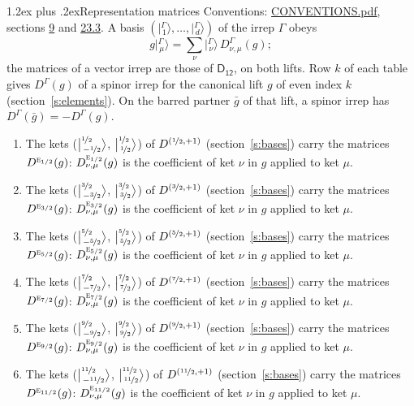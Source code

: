 \documentclass[10pt,a4paper]{article}
\makeatletter
\renewcommand\section{\@startsection{section}{1}{\z@}{-3ex plus -1ex minus -.2ex}%
  {1.2ex plus .2ex}{\normalfont\large\sffamily\bfseries\color{parttitle}}}
\numberwithin{equation}{section}
\newcommand{\grp}[1]{\mathsf{#1}}
\newcommand{\irr}[1]{\text{\normalfont\scshape #1}}
\newcommand{\irrJp}[2]{D^{(#1,#2)}}
\newcommand{\repD}[1]{D^{#1}}
\newcommand{\intx}{\mu}
\newcommand{\jm}[2]{\bigl\lvert{}^{#1}_{\,#2}\bigr\rangle}
\newcommand{\irket}[2]{\bigl\lvert{}^{#1}_{\,#2}\bigr\rangle}
\newcommand{\barred}[1]{\bar{#1}}
\newenvironment{romanlist}{\begin{enumerate}%
\renewcommand{\labelenumi}{(\roman{enumi})}}%
  {\end{enumerate}}
\makeatother
\begin{document}
\section{Representation matrices}\label{s:irrep_matrices}
Conventions: \href{../../CONVENTIONS.pdf}{CONVENTIONS.pdf}, sections \href{../../../rotation/CONVENTIONS.pdf\#conv.9}{9} and \href{../../CONVENTIONS.pdf\#conv.23.3}{23.3}.
\leavevmode\label{n:vector.ket.partner}\label{n:index.partner}\label{n:matrix.irrep}\label{n:index.partner.summed}A basis $(\irket{\Gamma}{1}, \dots, \irket{\Gamma}{d})$ of the irrep $\Gamma$ obeys
\begin{equation}\label{e:partner}g\irket{\Gamma}{\intx} = \sum_\nu \irket{\Gamma}{\nu}\, \repD{\Gamma}_{\nu,\intx}(g);\end{equation}
the matrices of a vector irrep are those of \href{../../../rotation/data/pdf/D12.pdf}{$\grp{D_{12}}$}, on both lifts. Row $k$ of each table gives $\repD{\Gamma}(g)$ of a spinor irrep for the canonical lift $g$ of even index $k$ (section~\ref{s:elements}). On the barred partner $\barred{g}$ of that lift, a spinor irrep has $\repD{\Gamma}(\barred{g}) = -\repD{\Gamma}(g)$.
\begin{romanlist}\raggedright
\item The kets ($\jm{\nicefrac{1}{2}}{-\nicefrac{1}{2}}$, $\jm{\nicefrac{1}{2}}{\nicefrac{1}{2}}$) of $\irrJp{\nicefrac{1}{2}}{+1}$ (section~\ref{s:bases}) carry the matrices $\repD{\irr{e}_{1/2}}(g)$: $\repD{\irr{e}_{1/2}}_{\nu,\intx}(g)$ is the coefficient of ket $\nu$ in $g$ applied to ket $\intx$.
\item The kets ($\jm{\nicefrac{3}{2}}{-\nicefrac{3}{2}}$, $\jm{\nicefrac{3}{2}}{\nicefrac{3}{2}}$) of $\irrJp{\nicefrac{3}{2}}{+1}$ (section~\ref{s:bases}) carry the matrices $\repD{\irr{e}_{3/2}}(g)$: $\repD{\irr{e}_{3/2}}_{\nu,\intx}(g)$ is the coefficient of ket $\nu$ in $g$ applied to ket $\intx$.
\item The kets ($\jm{\nicefrac{5}{2}}{-\nicefrac{5}{2}}$, $\jm{\nicefrac{5}{2}}{\nicefrac{5}{2}}$) of $\irrJp{\nicefrac{5}{2}}{+1}$ (section~\ref{s:bases}) carry the matrices $\repD{\irr{e}_{5/2}}(g)$: $\repD{\irr{e}_{5/2}}_{\nu,\intx}(g)$ is the coefficient of ket $\nu$ in $g$ applied to ket $\intx$.
\item The kets ($\jm{\nicefrac{7}{2}}{-\nicefrac{7}{2}}$, $\jm{\nicefrac{7}{2}}{\nicefrac{7}{2}}$) of $\irrJp{\nicefrac{7}{2}}{+1}$ (section~\ref{s:bases}) carry the matrices $\repD{\irr{e}_{7/2}}(g)$: $\repD{\irr{e}_{7/2}}_{\nu,\intx}(g)$ is the coefficient of ket $\nu$ in $g$ applied to ket $\intx$.
\item The kets ($\jm{\nicefrac{9}{2}}{-\nicefrac{9}{2}}$, $\jm{\nicefrac{9}{2}}{\nicefrac{9}{2}}$) of $\irrJp{\nicefrac{9}{2}}{+1}$ (section~\ref{s:bases}) carry the matrices $\repD{\irr{e}_{9/2}}(g)$: $\repD{\irr{e}_{9/2}}_{\nu,\intx}(g)$ is the coefficient of ket $\nu$ in $g$ applied to ket $\intx$.
\item The kets ($\jm{\nicefrac{11}{2}}{-\nicefrac{11}{2}}$, $\jm{\nicefrac{11}{2}}{\nicefrac{11}{2}}$) of $\irrJp{\nicefrac{11}{2}}{+1}$ (section~\ref{s:bases}) carry the matrices $\repD{\irr{e}_{11/2}}(g)$: $\repD{\irr{e}_{11/2}}_{\nu,\intx}(g)$ is the coefficient of ket $\nu$ in $g$ applied to ket $\intx$.
\end{romanlist}
\end{document}
